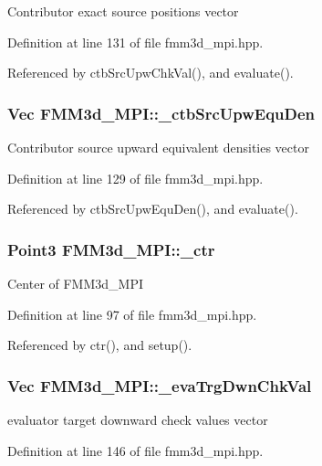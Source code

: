 Contributor exact source positions vector 

Definition at line 131 of file fmm3d\_\-mpi.hpp.

Referenced by ctb\-Src\-Upw\-Chk\-Val(), and evaluate().
\subsubsection{\setlength{\rightskip}{0pt plus 5cm}Vec {\bf FMM3d\_\-MPI::\_\-ctb\-Src\-Upw\-Equ\-Den}\hspace{0.3cm}{\tt  [protected]}}\label{classFMM3d__MPI_ee82bed16a0a2776bb2a1fad8e0eeefa_ee82bed16a0a2776bb2a1fad8e0eeefa}


Contributor source upward equivalent densities vector 

Definition at line 129 of file fmm3d\_\-mpi.hpp.

Referenced by ctb\-Src\-Upw\-Equ\-Den(), and evaluate().
\subsubsection{\setlength{\rightskip}{0pt plus 5cm}Point3 {\bf FMM3d\_\-MPI::\_\-ctr}\hspace{0.3cm}{\tt  [protected]}}\label{classFMM3d__MPI_44a525e9e8f92f514cd56f283ba05f70_44a525e9e8f92f514cd56f283ba05f70}


Center of FMM3d\_\-MPI 

Definition at line 97 of file fmm3d\_\-mpi.hpp.

Referenced by ctr(), and setup().
\subsubsection{\setlength{\rightskip}{0pt plus 5cm}Vec {\bf FMM3d\_\-MPI::\_\-eva\-Trg\-Dwn\-Chk\-Val}\hspace{0.3cm}{\tt  [protected]}}\label{classFMM3d__MPI_5799255f10fddac806e865ffc836547f_5799255f10fddac806e865ffc836547f}


evaluator target downward check values vector 

Definition at line 146 of file fmm3d\_\-mpi.hpp.

